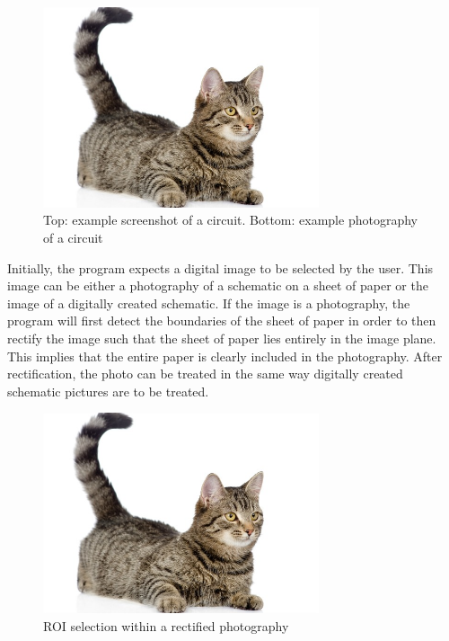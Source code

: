\documentclass[10pt,twocolumn,letterpaper]{article}
\begin{document}
\begin{figure}[!ht]
\includegraphics[width = 3.2in]{img/cat.jpg}
\caption{Top: example screenshot of a circuit. Bottom: example photography of a circuit}
\label{fig:c2}
\end{figure}

\par
Initially, the program expects a digital image to be selected by the user. This image can be either a photography of a schematic on a sheet of paper or the image of a digitally created schematic. If the image is a photography, the program will first detect the boundaries of the sheet of paper in order to then rectify the image such that the sheet of paper lies entirely in the image plane. This implies that the entire paper is clearly included in the photography. After rectification, the photo can be treated in the same way digitally created schematic pictures are to be treated.
\par

\begin{figure}[!ht]
\includegraphics[width = 3.2in]{img/cat.jpg}
\caption{ROI selection within a rectified photography}
\label{fig:c3}
\end{figure}
\end{document}

